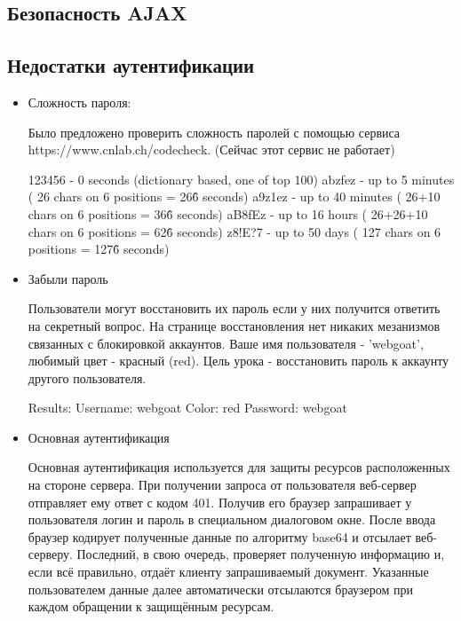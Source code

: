 \documentclass[11pt, a4paper]{article}		%
\begin{document}
\subsection{Безопасность AJAX}





\subsection{Недостатки аутентификации}

\begin{itemize}

\item Сложность пароля:

Было предложено проверить сложность паролей с помощью сервиса  https://www.cnlab.ch/codecheck. (Сейчас этот сервис не работает)

    123456 - 0 seconds (dictionary based, one of top 100)
    abzfez - up to 5 minutes ( 26 chars on 6 positions = 26\^6 seconds)
    a9z1ez - up to 40 minutes ( 26+10 chars on 6 positions = 36\^6 seconds)
    aB8fEz - up to 16 hours ( 26+26+10 chars on 6 positions = 62\^6 seconds)
    z8!E?7 - up to 50 days ( 127 chars on 6 positions = 127\^6 seconds)

\item Забыли пароль

Пользователи могут восстановить их пароль если у них получится ответить на секретный вопрос. На странице
восстановления нет никаких мезанизмов связанных с блокировкой аккаунтов. Ваше имя пользователя - 'webgoat',
любимый цвет - красный (red). Цель урока - восстановить пароль к аккаунту другого пользователя.

Results:
Username: webgoat
Color: red
Password: webgoat

\item Основная аутентификация

Основная аутентификация используется для защиты ресурсов расположенных на стороне сервера.
При получении запроса от пользователя веб-сервер отправляет ему ответ с кодом 401.
Получив его браузер запрашивает у пользователя логин и пароль в специальном диалоговом окне. После
ввода браузер кодирует полученные данные по алгоритму base64 и отсылает веб-серверу.
Последний, в свою очередь, проверяет полученную информацию и, если всё правильно, отдаёт клиенту запрашиваемый
документ. Указанные пользователем данные далее автоматически отсылаются браузером при каждом обращении к
защищённым ресурсам.


\end{itemize}
\end{document}
